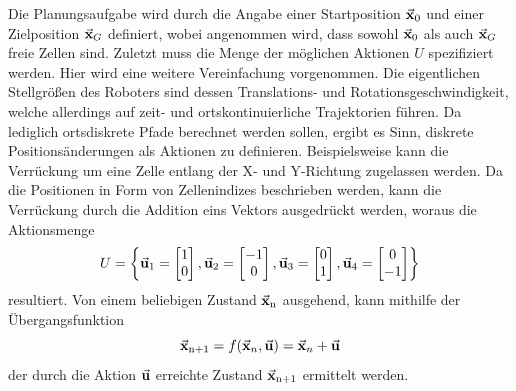 Die Planungsaufgabe wird durch die Angabe einer Startposition $\vec{\mathbf{x}}_0$ und einer Zielposition $\vec{\mathbf{x}}_G$ definiert, wobei angenommen wird, dass sowohl $\vec{\mathbf{x}}_0$ als auch $\vec{\mathbf{x}}_G$ freie Zellen sind.
Zuletzt muss die Menge der möglichen Aktionen $U$ spezifiziert werden. Hier wird eine weitere Vereinfachung vorgenommen. Die eigentlichen Stellgrößen des Roboters sind dessen Translations- und Rotationsgeschwindigkeit, welche allerdings auf zeit- und ortskontinuierliche Trajektorien führen. Da lediglich ortsdiskrete Pfade berechnet werden sollen, ergibt es Sinn, diskrete Positionsänderungen als Aktionen zu definieren. Beispielsweise kann die Verrückung um eine Zelle entlang der X- und Y-Richtung zugelassen werden. Da die Positionen in Form von Zellenindizes beschrieben werden, kann die Verrückung durch die Addition eins Vektors ausgedrückt werden, woraus die Aktionsmenge
\begin{equation}\label{eq_Uset}
U = \left\{ 
\vec{\mathbf{u}}_{\text{1}} = \begin{bmatrix} 1 \\ 0 \end{bmatrix}, 
\vec{\mathbf{u}}_{\text{2}} = \begin{bmatrix} -1 \\ 0 \end{bmatrix},
\vec{\mathbf{u}}_{\text{3}} = \begin{bmatrix} 0 \\ 1 \end{bmatrix},
\vec{\mathbf{u}}_{\text{4}} = \begin{bmatrix} 0 \\ -1\end{bmatrix} \right\}
\end{equation}
resultiert. Von einem beliebigen Zustand $\vec{\mathbf{x}}_{\text{n}}$ ausgehend, kann mithilfe der Übergangsfunktion
\begin{equation}\label{eq_fxnew}
\vec{\mathbf{x}}_{\text{n+1}} = f(\vec{\mathbf{x}}_n, \vec{\mathbf{u}}) = \vec{\mathbf{x}}_n + \vec{\mathbf{u}}
\end{equation}
der durch die Aktion $\vec{\mathbf{u}}$ erreichte Zustand $\vec{\mathbf{x}}_{\text{n+1}}$ ermittelt werden.

\newpage
